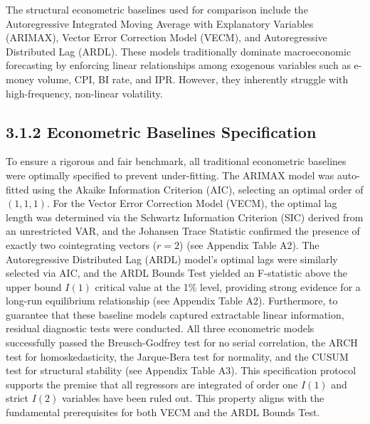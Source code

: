 \documentclass[12pt, letterpaper]{article}
\begin{document}
The structural econometric baselines used for comparison include the Autoregressive Integrated Moving Average with Explanatory Variables (ARIMAX), Vector Error Correction Model (VECM), and Autoregressive Distributed Lag (ARDL). These models traditionally dominate macroeconomic forecasting by enforcing linear relationships among exogenous variables such as e-money volume, CPI, BI rate, and IPR. However, they inherently struggle with high-frequency, non-linear volatility.

\subsection*{3.1.2 Econometric Baselines Specification}
To ensure a rigorous and fair benchmark, all traditional econometric baselines were optimally specified to prevent under-fitting. The ARIMAX model was auto-fitted using the Akaike Information Criterion (AIC), selecting an optimal order of $(1,1,1)$. For the Vector Error Correction Model (VECM), the optimal lag length was determined via the Schwartz Information Criterion (SIC) derived from an unrestricted VAR, and the Johansen Trace Statistic confirmed the presence of exactly two cointegrating vectors ($r=2$) (see Appendix Table A2). The Autoregressive Distributed Lag (ARDL) model's optimal lags were similarly selected via AIC, and the ARDL Bounds Test yielded an F-statistic above the upper bound $I(1)$ critical value at the 1\% level, providing strong evidence for a long-run equilibrium relationship (see Appendix Table A2). Furthermore, to guarantee that these baseline models captured extractable linear information, residual diagnostic tests were conducted. All three econometric models successfully passed the Breusch-Godfrey test for no serial correlation, the ARCH test for homoskedasticity, the Jarque-Bera test for normality, and the CUSUM test for structural stability (see Appendix Table A3). This specification protocol supports the premise that all regressors are integrated of order one $I(1)$ and strict $I(2)$ variables have been ruled out. This property aligns with the fundamental prerequisites for both VECM and the ARDL Bounds Test.
\end{document}
